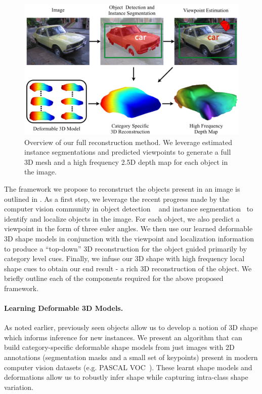 \begin{figure}[t]
\centering
\includegraphics[width = .9\textwidth]{figures/categoryshapes/figTest.pdf}
\caption{Overview of our full reconstruction method. We leverage estimated instance segmentations and predicted viewpoints to generate a full 3D mesh and a high frequency 2.5D depth map for each object in the image.}
\end{figure}

The framework we propose to reconstruct the objects present in an image is outlined in . As a first step, we leverage the recent progress made by the computer vision community in object detection ~\cite{rcnn} and instance segmentation~\cite{BharathECCV2014, BharathCVPR2015} to identify and localize objects in the image. For each object, we also predict a viewpoint in the form of three euler angles. We then use our learned deformable 3D shape models in conjunction with the viewpoint and localization information to produce a ``top-down'' 3D reconstruction for the object guided primarily by category level cues. Finally, we infuse our 3D shape with high frequency local shape cues to obtain our end result - a rich 3D reconstruction of the object. We briefly outline each of the components required for the above proposed framework.

\paragraph{Learning Deformable 3D Models.}
As noted earlier, previously seen objects allow us to develop a notion of 3D shape which informs inference for new instances. We present an algorithm that can build category-specific  deformable shape models from just images with 2D annotations (segmentation masks and a small set of keypoints) present in modern computer vision datasets (e.g. PASCAL VOC~\cite{pascal-voc-2012}). These learnt shape models and deformations allow us to robustly infer shape while capturing intra-class shape variation.

